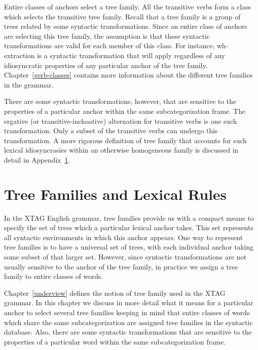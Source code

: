 Entire classes of anchors select a tree family. All the transitive
verbs form a class which selects the transitive tree family. Recall
that a tree family is a group of trees related by some syntactic
transformations. Since an entire class of anchors are selecting this
tree family, the assumption is that these syntactic transformations
are valid for each member of this class. For instance, wh- extraction
is a syntactic transformation that will apply regardless of any
idiosyncratic properties of any particular anchor of the tree family.
Chapter~\ref{verb-classes} contains more information about
the different tree families in the grammar.

There are some syntactic transformations, however, that are sensitive
to the properties of a particular anchor within the same
subcategorization frame. The ergative (or transitive-inchoative)
alternation for transitive verbs is one such transformation. Only a
subset of the transitive verbs can undergo this transformation. A more
rigorous definition of tree family that accounts for such lexical
idiosyncrasies within an otherwise homogeneous family is discussed in
detail in Appendix~\ref{families}.

\section{Tree Families and Lexical Rules}
\label{families}

In the XTAG English grammar, tree families provide us with a compact
means to specify the set of trees which a particular lexical anchor
takes. This set represents all syntactic environments in which this
anchor appears. One way to represent tree families is to have a
universal set of trees, with each individual anchor taking some subset
of that larger set.  However, since syntactic transformations are not
usually sensitive to the anchor of the tree family, in practice we
assign a tree family to entire classes of words. 

Chapter~\ref{underview} defines the notion of tree family used in the
XTAG grammar. In this chapter we discuss in more detail what it means
for a particular anchor to select several tree families keeping in
mind that entire classes of words which share the same
subcategorization are assigned tree families in the syntactic
database. Also, there are some syntactic transformations that are
sensitive to the properties of a particular word within the same
subcategorization frame.


